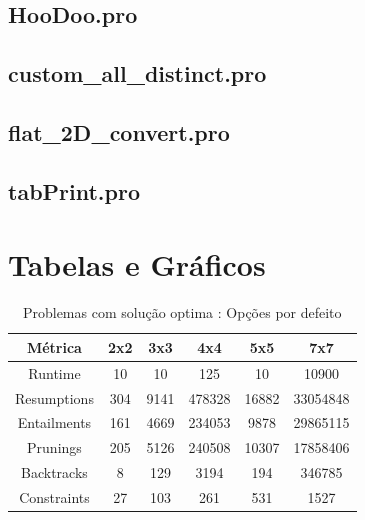 \documentclass{llncs}
\begin{document}
\subsection{Hoo\-Doo.pro}


\subsection{custom\_all\_distinct.pro}


\subsection{flat\_2D\_convert.pro}


\subsection{tabPrint.pro}


\newpage
\section{Tabelas e Gr\'{a}ficos}

\setlength{\tabcolsep}{12pt}
\begin{table}[ht] 
\caption{Problemas com solu\c{c}\~{a}o optima : Op\c{c}\~{o}es por defeito} %
\centering %
\begin{tabular}{c c c c c c} %
\hline\hline %

M\'{e}trica & 2x2 & 3x3 & 4x4 & 5x5 & 7x7\\ [0.5ex] %
\hline %
Runtime & 10 & 10 & 125 & 10 & 10900 \\ %
Resumptions & 304 & 9141 & 478328 & 16882 & 33054848 \\ 
Entailments & 161 & 4669 & 234053 & 9878 & 29865115  \\ 
Prunings & 205 & 5126 & 240508 & 10307 & 17858406 \\ 
Backtracks & 8 & 129 & 3194 & 194 & 346785 \\ 
Constraints & 27 & 103 & 261 & 531 & 1527 \\ [1ex] %
\hline %
\end{tabular} 
\label{tabela:1} %
\end{table}
\end{document}
